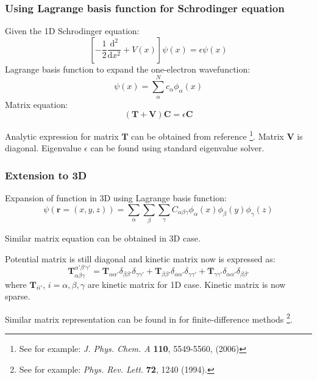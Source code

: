 \documentclass[10pt,t]{beamer}
\begin{document}
\begin{frame}
\frametitle{Using Lagrange basis function for Schrodinger equation}

Given the 1D Schrodinger equation:
\begin{equation*}
\left[ -\frac{1}{2}\frac{\mathrm{d}^2}{\mathrm{d}x^2} + V(x)\right ] \psi(x)
= \epsilon \psi(x)
\end{equation*}
Lagrange basis function to expand the one-electron wavefunction:
\begin{equation*}
\psi(x) = \sum_{\alpha}^{N} c_{\alpha} \phi_{\alpha}(x)
\end{equation*}
Matrix equation:
\begin{equation*}
\left( \mathbf{T} + \mathbf{V} \right) \mathbf{C} = \epsilon \mathbf{C}
\end{equation*}

Analytic expression for matrix $\mathbf{T}$ can be obtained from reference
\footnote{See for example: \textit{J. Phys. Chem. A}
\textbf{110}, {5549-5560}, (2006)}.
Matrix $\mathbf{V}$ is diagonal.
Eigenvalue $\epsilon$ can be found using standard eigenvalue solver.

\end{frame}



\begin{frame}
\frametitle{Extension to 3D}

Expansion of function in 3D using Lagrange basis function:
\begin{equation*}
\psi(\mathbf{r} = (x,y,z)) =
\sum_{\alpha}\sum_{\beta}\sum_{\gamma} C_{\alpha\beta\gamma}
\phi_{\alpha}(x) \phi_{\beta}(y) \phi_{\gamma}(z)
\end{equation*}

Similar matrix equation can be obtained in 3D case.

Potential matrix is still diagonal and kinetic matrix now is expressed as:
\begin{equation*}
\mathbf{T}_{\alpha\beta\gamma}^{\alpha'\beta'\gamma'} =
\mathbf{T}_{\alpha\alpha'}\delta_{\beta\beta'}\delta_{\gamma\gamma'} +
\mathbf{T}_{\beta\beta'}\delta_{\alpha\alpha'}\delta_{\gamma\gamma'} +
\mathbf{T}_{\gamma\gamma'}\delta_{\alpha\alpha'}\delta_{\beta\beta'}
\end{equation*}
where $\mathbf{T}_{ii'}$, $i=\alpha,\beta,\gamma$ are kinetic matrix for 1D case.
Kinetic matrix is now sparse.

Similar matrix representation can be found in for finite-difference methods
\footnote{See for example: \textit{Phys. Rev. Lett.} \textbf{72}, 1240 (1994).}.

\end{frame}
\end{document}
